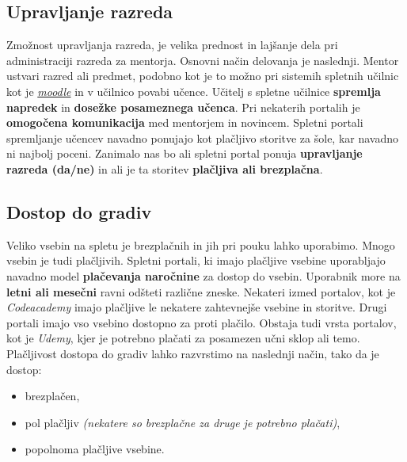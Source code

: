 \subsection{Upravljanje razreda}
\label{sec:upravljanje_razreda}

Zmožnost upravljanja razreda, je velika prednost in lajšanje dela pri
administraciji razreda za mentorja. Osnovni način delovanja je
naslednji. Mentor ustvari razred ali predmet, podobno kot je to možno
pri sistemih spletnih učilnic kot je
\emph{\href{https://moodle.org/}{moodle}} \cite{web:moodle_site} in v
učilnico povabi učence. Učitelj s spletne učilnice \textbf{spremlja
  napredek} in \textbf{dosežke posameznega učenca}. Pri nekaterih
portalih je \textbf{omogočena komunikacija} med mentorjem in
novincem. Spletni portali spremljanje učencev navadno ponujajo kot
plačljivo storitve za šole, kar navadno ni najbolj poceni. Zanimalo
nas bo ali spletni portal ponuja \textbf{upravljanje razreda (da/ne)}
in ali je ta storitev \textbf{plačljiva ali brezplačna}.

\subsection{Dostop do gradiv}
\label{sec:dostop_do_gradiv}

Veliko vsebin na spletu je brezplačnih in jih pri pouku lahko
uporabimo. Mnogo vsebin je tudi plačljivih. Spletni portali, ki imajo
plačljive vsebine uporabljajo navadno model \textbf{plačevanja
  naročnine} za dostop do vsebin. Uporabnik more na \textbf{letni ali
  mesečni} ravni odšteti različne zneske. Nekateri izmed portalov, kot
je \emph{Codeacademy} imajo plačljive le nekatere zahtevnejše vsebine
in storitve. Drugi portali imajo vso vsebino dostopno za proti
plačilo. Obstaja tudi vrsta portalov, kot je \emph{Udemy}, kjer je
potrebno plačati za posamezen učni sklop ali temo.  Plačljivost
dostopa do gradiv lahko razvrstimo na naslednji način, tako da je
dostop:

\begin{itemize}
  \tightlist
\item brezplačen,
\item pol plačljiv \emph{(nekatere so brezplačne za druge je potrebno
    plačati)},
\item popolnoma plačljive vsebine.
\end{itemize}


